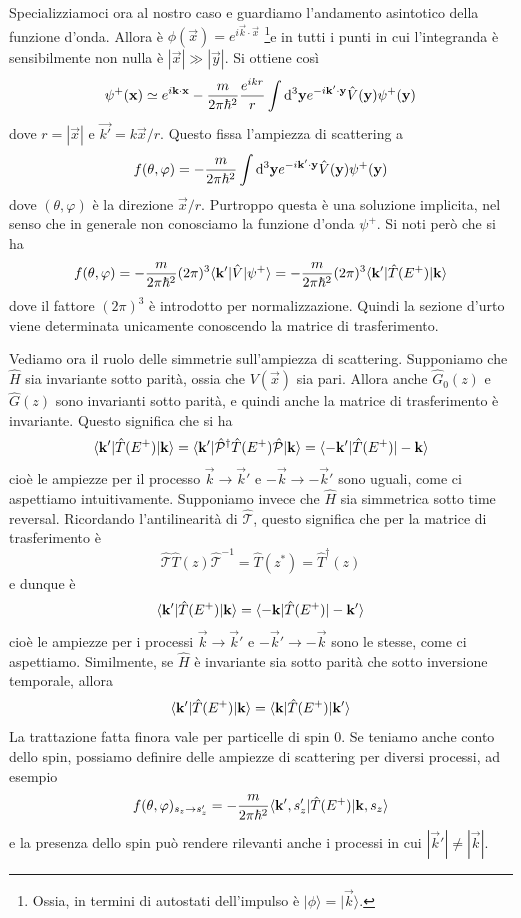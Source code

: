\documentclass[a4paper, 11pt]{article}
\newcommand{\op}[1]{\hat{#1}}
\renewcommand{\op}[1]{\hat{#1}}
\newcommand{\ham}{\hat{H}}
\renewcommand{\ket}[1]{| #1\rangle}
\renewcommand{\P}{\op{\mathcal{P}}}
\newcommand{\T}{\op{\mathcal{T}}}
\begin{document}
Specializziamoci ora al nostro caso e guardiamo l'andamento asintotico della funzione d'onda. Allora è $\phi(\vec{x})=e^{i\vec{k}\cdot\vec{x}}$ \footnote{Ossia, in termini di autostati dell'impulso è $\ket{\phi}=\ket{\vec{k}}$.}e in tutti i punti in cui l'integranda è sensibilmente non nulla è $|\vec{x}|\gg|\vec{y}|$. Si ottiene così
\[\psi^+(\vec{x})\simeq e^{i\vec{k}\cdot\vec{x}}-\frac{m}{2\pi\hbar^2}\frac{e^{ikr}}{r}\int\d^3\vec{y}e^{-i\vec{k}'\cdot\vec{y}}\op V(\vec{y})\psi^+(\vec{y})\]
dove $r=|\vec{x}|$ e $\vec{k'}=k\vec{x}/r$. Questo fissa l'ampiezza di scattering a
\[f(\theta,\varphi)=-\frac{m}{2\pi\hbar^2}\int\d^3\vec{y}e^{-i\vec{k}'\cdot\vec{y}}\op V(\vec{y})\psi^+(\vec{y})\]
dove $(\theta,\varphi)$ è la direzione $\vec{x}/r$. Purtroppo questa è una soluzione implicita, nel senso che in generale non conosciamo la funzione d'onda $\psi^+$. Si noti però che si ha
\[f(\theta,\varphi)=-\frac{m}{2\pi\hbar^2}(2\pi)^3\braketop{\vec{k}'}{\op V}{\psi^+}=-\frac{m}{2\pi\hbar^2}(2\pi)^3\braketop{\vec{k}'}{\op T(E^+)}{\vec{k}}\]
dove il fattore $(2\pi)^3$ è introdotto per normalizzazione. Quindi la sezione d'urto viene determinata unicamente conoscendo la matrice di trasferimento. 

Vediamo ora il ruolo delle simmetrie sull'ampiezza di scattering. Supponiamo che $\ham$ sia invariante sotto parità, ossia che $V(\vec{x})$ sia pari. Allora anche $\op G_0(z)$ e $\op G(z)$ sono invarianti sotto parità, e quindi anche la matrice di trasferimento è invariante. Questo significa che si ha
\[\braketop{\vec{k}'}{\op T(E^+)}{\vec{k}}=\braketop{\vec{k}'}{\P^\dagger\op T(E^+)\P}{\vec{k}}=\braketop{-\vec{k}'}{\op T(E^+)}{-\vec{k}}\]
cioè le ampiezze per il processo $\vec{k}\to\vec{k}'$ e $-\vec{k}\to-\vec{k}'$ sono uguali, come ci aspettiamo intuitivamente. Supponiamo invece che $\ham$ sia simmetrica sotto time reversal. Ricordando l'antilinearità di $\T$, questo significa che per la matrice di trasferimento è
\[\T\op T(z)\T^{-1}=\op T(z^*)=\op T^\dagger(z)\]
e dunque è
\[\braketop{\vec{k}'}{\op T(E^+)}{\vec{k}}=\braketop{-\vec{k}}{\op T(E^+)}{-\vec{k}'}\]
cioè le ampiezze per i processi $\vec{k}\to\vec{k}'$ e $-\vec{k}'\to-\vec{k}$ sono le stesse, come ci aspettiamo. Similmente, se $\ham$ è invariante sia sotto parità che sotto inversione temporale, allora 
\[\braketop{\vec{k}'}{\op T(E^+)}{\vec{k}}=\braketop{\vec{k}}{\op T(E^+)}{\vec{k}'}\]
La trattazione fatta finora vale per particelle di spin 0. Se teniamo anche conto dello spin, possiamo definire delle ampiezze di scattering per diversi processi, ad esempio
\[f(\theta,\varphi)_{s_z\to s'_z}=-\frac{m}{2\pi\hbar^2}\braketop{\vec{k}',s'_z}{\op T(E^+)}{\vec{k},s_z}\]
e la presenza dello spin può rendere rilevanti anche i processi in cui $|\vec{k}'|\neq|\vec{k}|$.
\end{document}
